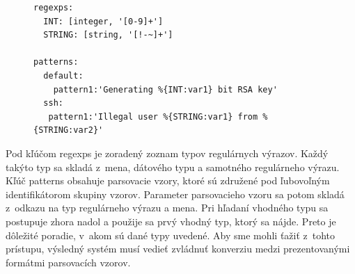 \begin{figure}[h]
\centering
\begin{minipage}{\textwidth}
\lstset{columns=flexible,breaklines=true,breakatwhitespace=true, showstringspaces=false}
\begin{lstlisting}
regexps:
  INT: [integer, '[0-9]+']
  STRING: [string, '[!-~]+']
  
patterns:
  default:
    pattern1:'Generating %{INT:var1} bit RSA key'
  ssh:
   pattern1:'Illegal user %{STRING:var1} from %{STRING:var2}'
\end{lstlisting} 		
\end{minipage} 
\end{figure}

Pod kľúčom regexps je zoradený zoznam typov regulárnych výrazov. Každý takýto typ sa skladá z~mena, dátového typu a samotného regulárneho výrazu. Kľúč patterns obsahuje parsovacie vzory, ktoré sú združené pod ľubovoľným identifikátorom skupiny vzorov. Parameter parsovacieho vzoru sa potom skladá z~odkazu na typ regulárneho výrazu a mena. Pri hľadaní vhodného typu sa postupuje zhora nadol a použije sa prvý vhodný typ, ktorý sa nájde. Preto je dôležité poradie, v~akom sú dané typy uvedené.  Aby sme mohli ťažiť z~tohto prístupu, výsledný systém musí vedieť zvládnuť konverziu medzi prezentovanými formátmi parsovacích vzorov.